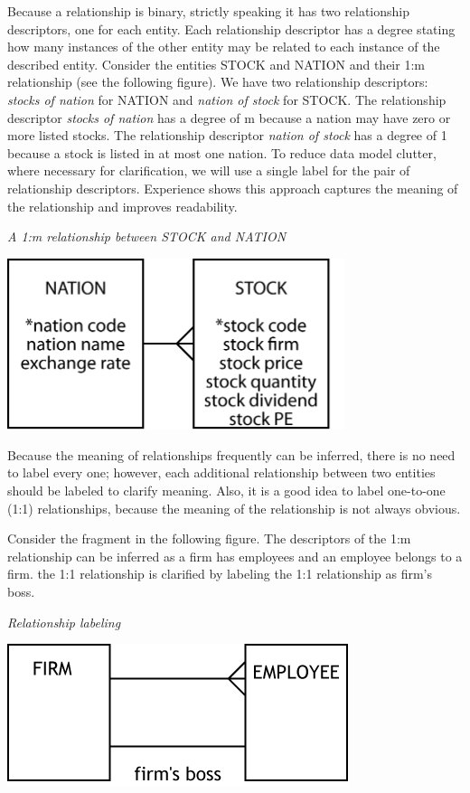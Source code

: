 \documentclass[
]{article}
\begin{document}
Because a relationship is binary, strictly speaking it has two
relationship descriptors, one for each entity. Each relationship
descriptor has a degree stating how many instances of the other entity
may be related to each instance of the described entity. Consider the
entities STOCK and NATION and their 1:m relationship (see the following
figure). We have two relationship descriptors: \emph{stocks of nation} for
NATION and \emph{nation of stock} for STOCK. The relationship descriptor
\emph{stocks of nation} has a degree of m because a nation may have zero or
more listed stocks. The relationship descriptor \emph{nation of stock} has a
degree of 1 because a stock is listed in at most one nation. To reduce
data model clutter, where necessary for clarification, we will use a
single label for the pair of relationship descriptors. Experience shows
this approach captures the meaning of the relationship and improves
readability.

\emph{A 1:m relationship between STOCK and NATION}

\includegraphics[width=3.89583in,height=\textheight]{Figures/Chapter 4/nation-stock.png}

Because the meaning of relationships frequently can be inferred, there
is no need to label every one; however, each additional relationship
between two entities should be labeled to clarify meaning. Also, it is a
good idea to label one-to-one (1:1) relationships, because the meaning
of the relationship is not always obvious.

Consider the fragment in the following figure. The descriptors of the
1:m relationship can be inferred as a firm has employees and an employee
belongs to a firm. the 1:1 relationship is clarified by labeling the 1:1
relationship as firm's boss.

\emph{Relationship labeling}

\includegraphics{Figures/Chapter 7/relationship labeling.png}
\end{document}
